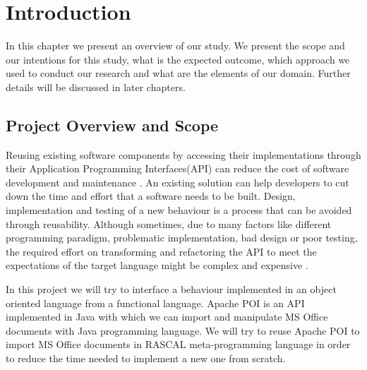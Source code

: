 
\chapter{Introduction} %

\label{Chapter1} %


In this chapter we present an overview of our study. We present the scope and our intentions for this study, what is the expected outcome, which approach we used to conduct our research and what are the elements of our domain. Further details will be discussed in later chapters.

\section{Project Overview and Scope}

Reusing existing software components by accessing their implementations through their Application Programming Interfaces(API) can reduce the cost of software development and maintenance \cite{Nguyen2010}. An existing solution can help developers to cut down the time and effort that a software needs to be built. Design, implementation and testing of a new behaviour is a process that can be avoided through reusability. Although sometimes, due to many factors like different programming paradigm, problematic implementation, bad design or poor testing, the required effort on transforming and refactoring the API to meet the expectations of the target language might be complex and expensive \cite{studyAPIxml}.

In this project we will try to interface a behaviour implemented in an object oriented language from a functional language. Apache POI is an API implemented in Java with which we can import and manipulate MS Office documents with Java programming language. We will try to reuse Apache POI to import MS Office documents in RASCAL meta-programming language in order to reduce the time needed to implement a new one from scratch. 

